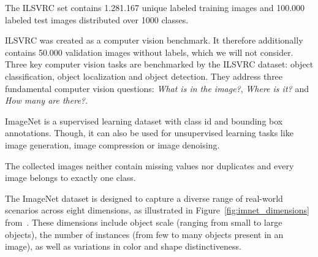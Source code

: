 The ILSVRC set contains 1.281.167 unique labeled training images and 100.000 labeled test images distributed over 1000
classes.

ILSVRC was created as a computer vision benchmark.
It therefore additionally contains 50.000 validation images without labels, which we will not consider.
Three key computer vision tasks are benchmarked by the ILSVRC dataset: object classification, object localization and
object detection.
They address three fundamental computer vision questions: \textit{What is in the image?}, \textit{Where is it?} and
\textit{How many are there?}.

ImageNet is a supervised learning dataset with class id and bounding box annotations.
Though, it can also be used for unsupervised learning tasks like image generation, image compression or image denoising.

The collected images neither contain missing values nor duplicates and every image belongs to exactly one class.

The ImageNet dataset is designed to capture a diverse range of real-world scenarios across eight dimensions, as
illustrated in Figure~\ref{fig:imnet_dimensions} from~\cite{imagenet_breakdown}.
These dimensions include object scale (ranging from small to large objects), the number of instances (from few to many
objects present in an image), as well as variations in color and shape distinctiveness.


